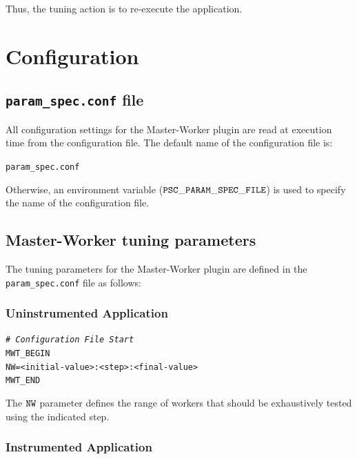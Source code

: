 \documentclass[11pt,a4paper, oneside]{book} %
\newenvironment{code}%
{
\addtolength{\leftskip}{0.5cm}}%
{

}
\begin{document}
 Thus, the tuning action is to re-execute the application.



\chapter{Configuration}
\section{\texttt{param\_spec.conf} file}
All configuration settings for the Master-Worker plugin are read at execution time from the configuration file. The default name of the configuration file is:

\begin{center}
\texttt{param\_spec.conf}
\end{center}

Otherwise, an environment variable ($\tt {PSC\_PARAM\_SPEC\_FILE}$) is used to specify the name of the configuration file.

\section{Master-Worker tuning parameters}
The tuning parameters for the Master-Worker plugin are defined in the \texttt{param\_spec.conf} file as follows:


\subsection{Uninstrumented Application}

\begin{code}
\texttt{\textit{\# Configuration File Start}} \\
\texttt{MWT\_BEGIN} \\
\texttt{NW=<initial-value>:<step>:<final-value>} \\
\texttt{MWT\_END} \\
\end{code}

The {$\tt NW$} parameter defines the range of workers that should be exhaustively tested using the indicated step.

\subsection{Instrumented Application}
\end{document}
